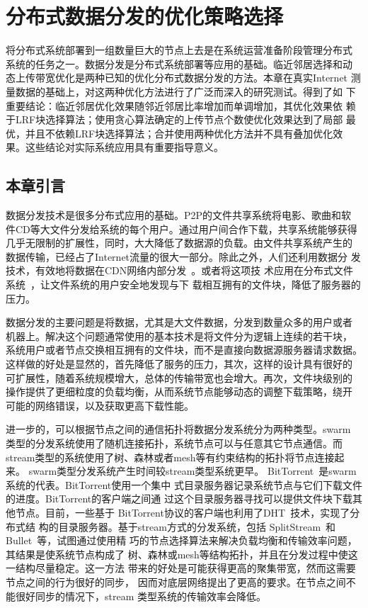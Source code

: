 \chapter{分布式数据分发的优化策略选择}
\label{chap:bt}

将分布式系统部署到一组数量巨大的节点上去是在系统运营准备阶段管理分布式
系统的任务之一。数据分发是分布式系统部署等应用的基础。临近邻居选择和动
态上传带宽优化是两种已知的优化分布式数据分发的方法。本章在真实Internet
测量数据的基础上，对这两种优化方法进行了广泛而深入的研究测试。得到了如
下重要结论：临近邻居优化效果随邻近邻居比率增加而单调增加，其优化效果依
赖于LRF块选择算法；使用贪心算法确定的上传节点个数使优化效果达到了局部
最优，并且不依赖LRF块选择算法；合并使用两种优化方法并不具有叠加优化效
果。这些结论对实际系统应用具有重要指导意义。

\section{本章引言}


数据分发技术是很多分布式应用的基础。P2P的文件共享系统将电影、歌曲和软
件CD等大文件分发给系统的每个用户。通过用户间合作下载，共享系统能够获得
几乎无限制的扩展性，同时，大大降低了数据源的负载。由文件共享系统产生的
数据传输，已经占了Internet流量的很大一部分。除此之外，人们还利用数据分
发技术，有效地将数据在CDN网络内部分发~\cite{fastreplica}。或者将这项技
术应用在分布式文件系统~\cite{sharkfs}，让文件系统的用户安全地发现与下
载相互拥有的文件块，降低了服务器的压力。

数据分发的主要问题是将数据，尤其是大文件数据，分发到数量众多的用户或者
机器上。解决这个问题通常使用的基本技术是将文件分为逻辑上连续的若干块，
系统用户或者节点交换相互拥有的文件块，而不是直接向数据源服务器请求数据。
这样做的好处是显然的，首先降低了服务的压力，其次，这样的设计具有很好的
可扩展性，随着系统规模增大，总体的传输带宽也会增大。再次，文件块级别的
操作提供了更细粒度的负载均衡，从而系统节点能够动态的调整下载策略，绕开
可能的网络错误，以及获取更高下载性能。

进一步的，可以根据节点之间的通信拓扑将数据分发系统分为两种类型。swarm
类型的分发系统使用了随机连接拓扑，系统节点可以与任意其它节点通信。而
stream类型的系统使用了树、森林或者mesh等有约束结构的拓扑将节点连接起来。
swarm类型分发系统产生时间较stream类型系统更早。
BitTorrent~\cite{bittorrent}是swarm系统的代表。BitTorrent使用一个集中
式目录服务器记录系统节点与它们下载文件的进度。BitTorrent的客户端之间通
过这个目录服务器寻找可以提供文件块下载其他节点。目前，一些基于
BitTorrent协议的客户端也利用了DHT~\cite{kademlia}技术，实现了分布式结
构的目录服务器。基于stream方式的分发系统，包括
SplitStream~\cite{splitstream}和Bullet~\cite{bullet}等，试图通过使用精
巧的节点选择算法来解决负载均衡和传输效率问题，其结果是使系统节点构成了
树、森林或mesh等结构拓扑，并且在分发过程中使这一结构尽量稳定。这一方法
带来的好处是可能获得更高的聚集带宽，然而这需要节点之间的行为很好的同步，
因而对底层网络提出了更高的要求。在节点之间不能很好同步的情况下，stream
类型系统的传输效率会降低。

